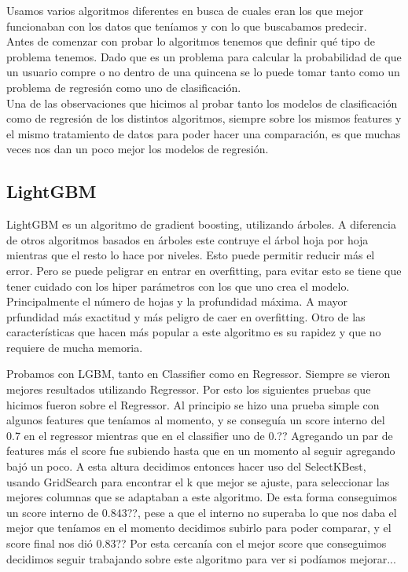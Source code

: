 \documentclass[a4paper]{article}
\begin{document}
    Usamos varios algoritmos diferentes en busca de cuales eran los que mejor funcionaban con los datos que teníamos y con lo que buscabamos predecir.\\
    Antes de comenzar con probar lo algoritmos tenemos que definir qué tipo de problema tenemos. Dado que es un problema para calcular la probabilidad de que un usuario compre o no dentro de una quincena se lo puede tomar tanto como un problema de regresión como uno de clasificación.\\
    Una de las observaciones que hicimos al probar tanto los modelos de clasificación como de regresión de los distintos algoritmos, siempre sobre los mismos features y el mismo tratamiento de datos para poder hacer una comparación, es que muchas veces nos dan un poco mejor los modelos de regresión.\\
    
    \subsection{LightGBM}\label{subsec:lightgbm}
    
        LightGBM es un algoritmo de gradient boosting, utilizando árboles. A diferencia de otros algoritmos basados en árboles este contruye el árbol hoja por hoja mientras que el resto lo hace por niveles. Esto puede permitir reducir más el error. Pero se puede peligrar en entrar en overfitting, para evitar esto se tiene que tener cuidado con los hiper parámetros con los que uno crea el modelo. Principalmente el número de hojas y la profundidad máxima. A mayor prfundidad más exactitud y más peligro de caer en overfitting.
        Otro de las características que hacen más popular a este algoritmo es su rapidez y que no requiere de mucha memoria.
        
        Probamos con LGBM, tanto en Classifier como en Regressor. Siempre se vieron mejores resultados utilizando Regressor. Por esto los siguientes pruebas que hicimos fueron sobre el Regressor.
        Al principio se hizo una prueba simple con algunos features que teníamos al momento, y se conseguía un score interno del 0.7 en el regressor mientras que en el classifier uno de 0.?? Agregando un par de features más el score fue subiendo hasta que en un momento al seguir agregando bajó un poco. A esta altura decidimos entonces hacer uso del SelectKBest, usando GridSearch para encontrar el k que mejor se ajuste, para seleccionar las mejores columnas que se adaptaban a este algoritmo. De esta forma conseguimos un score interno de 0.843??, pese a que el interno no superaba lo que nos daba el mejor que teníamos en el momento decidimos subirlo para poder comparar, y el score final nos dió 0.83?? Por esta cercanía con el mejor score que conseguimos decidimos seguir trabajando sobre este algoritmo para ver si podíamos mejorar...\\
    
\end{document}
